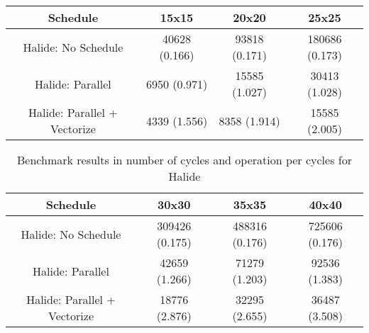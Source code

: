 
\begin{table}[ht]
\begin{center}
\begin{tabular}{|c||c|c|c|}
\hline
Schedule& 15x15& 20x20& 25x25\\ 
\hline
\hline
Halide: No Schedule& 40628 (0.166)& 93818 (0.171)& 180686 (0.173)\\ 
\hline
Halide: Parallel& 6950 (0.971)& 15585 (1.027)& 30413 (1.028)\\ 
\hline
Halide: Parallel + Vectorize& 4339 (1.556)& 8358 (1.914)& 15585 (2.005)\\ 
\hline

\end{tabular}
\end{center}
\end{table}


\begin{table}[ht]
\begin{center}
\begin{tabular}{|c||c|c|c|}
\hline
Schedule& 30x30& 35x35& 40x40\\ 
\hline
\hline
Halide: No Schedule& 309426 (0.175)& 488316 (0.176)& 725606 (0.176)\\ 
\hline
Halide: Parallel& 42659 (1.266)& 71279 (1.203)& 92536 (1.383)\\ 
\hline
Halide: Parallel + Vectorize& 18776 (2.876)& 32295 (2.655)& 36487 (3.508)\\ 
\hline

\end{tabular}
\end{center}
	\caption{ Benchmark results in number of cycles and operation per cycles for Halide}
	\label{Table:BenchmarksHalide}
\end{table}

